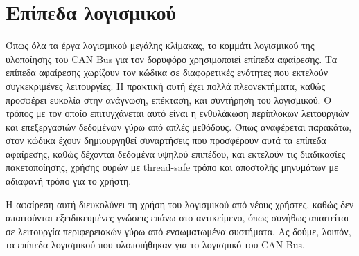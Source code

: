 \documentclass[a4paper,nobib,justified]{tufte-book}
\begin{document}
\section{Επίπεδα λογισμικού}
Όπως όλα τα έργα λογισμικού μεγάλης κλίμακας, το κομμάτι λογισμικού της υλοποίησης του CAN Bus για τον δορυφόρο χρησιμοποιεί επίπεδα αφαίρεσης. Τα επίπεδα αφαίρεσης χωρίζουν τον κώδικα σε διαφορετικές ενότητες που εκτελούν συγκεκριμένες λειτουργίες. Η πρακτική αυτή έχει πολλά πλεονεκτήματα, καθώς προσφέρει ευκολία στην ανάγνωση, επέκταση, και συντήρηση του λογισμικού. Ο τρόπος με τον οποίο επιτυγχάνεται αυτό είναι η ενθυλάκωση περίπλοκων λειτουργιών και επεξεργασιών δεδομένων γύρω από απλές μεθόδους. Όπως αναφέρεται παρακάτω, στον κώδικα έχουν δημιουργηθεί συναρτήσεις που προσφέρουν αυτά τα επίπεδα αφαίρεσης, καθώς δέχονται δεδομένα υψηλού επιπέδου, και εκτελούν τις διαδικασίες πακετοποίησης, χρήσης ουρών με thread-safe τρόπο και αποστολής μηνυμάτων με αδιαφανή τρόπο για το χρήστη.

Η αφαίρεση αυτή διευκολύνει τη χρήση του λογισμικού από νέους χρήστες, καθώς δεν απαιτούνται εξειδικευμένες γνώσεις επάνω στο αντικείμενο, όπως συνήθως απαιτείται σε λειτουργία περιφερειακών γύρω από ενσωματωμένα συστήματα. Ας δούμε, λοιπόν, τα επίπεδα λογισμικού που υλοποιήθηκαν για το λογισμικό του CAN Bus.
\end{document}
